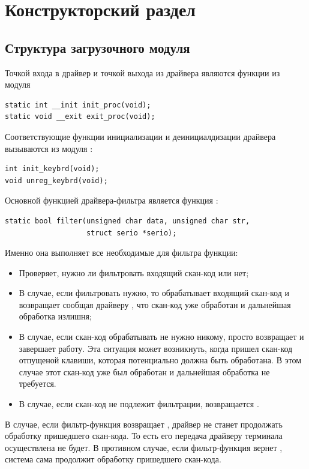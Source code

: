
\section{Конструкторский раздел}

\subsection{Структура загрузочного модуля}
Точкой входа в драйвер и точкой выхода из драйвера являются функции из модуля 
\begin{lstlisting}
static int __init init_proc(void);
static void __exit exit_proc(void);
\end{lstlisting}
Соответствующие функции инициализации и деинициалдизации драйвера
вызываются из модуля :
\begin{lstlisting}
int init_keybrd(void);
void unreg_keybrd(void);
\end{lstlisting}
\newpar

Основной функцией драйвера-фильтра является функция :
\begin{lstlisting}
static bool filter(unsigned char data, unsigned char str, 
				   struct serio *serio);
\end{lstlisting}
Именно она выполняет все необходимые для фильтра функции:
\begin{itemize}
	\item Проверяет, нужно ли фильтровать входящий скан-код или нет;
	\item В случае, если фильтровать нужно, то обрабатывает входящий
		скан-код и возвращает  сообщая драйверу 
		, что скан-код уже обработан и дальнейшая
		обработка излишня;
	\item В случае, если скан-код обрабатывать не нужно никому, просто
		возвращает  и завершает работу. Эта ситуация
		может возникнуть, когда пришел скан-код отпущеной клавиши,
		которая потенциально должна быть обработана. В этом случае
		этот скан-код уже был обработан и дальнейшая обработка не 
		требуется.
	\item В случае, если скан-код не подлежит фильтрации, возвращается
		.
\end{itemize}
В случае, если фильтр-функция возвращает , драйвер  не станет
продолжать обработку пришедшего скан-кода. То есть его передача драйверу терминала осуществлена
не будет. В противном случае, если фильтр-функция вернет , система сама продолжит обработку
пришедшего скан-кода.
\newpar

